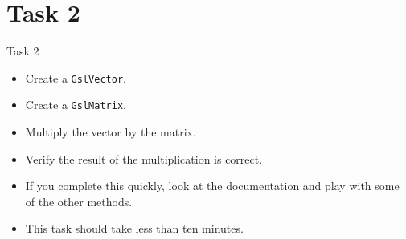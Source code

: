 \section{Task 2}
\begin{frame}[fragile]{Task 2}
  \begin{itemize}
    \item Create a \texttt{GslVector}.
    \item Create a \texttt{GslMatrix}.
    \item Multiply the vector by the matrix.
    \item Verify the result of the multiplication is correct.
    \item If you complete this quickly, look at the documentation and play with
      some of the other methods.
    \item This task should take less than ten minutes.
  \end{itemize}
\end{frame}
